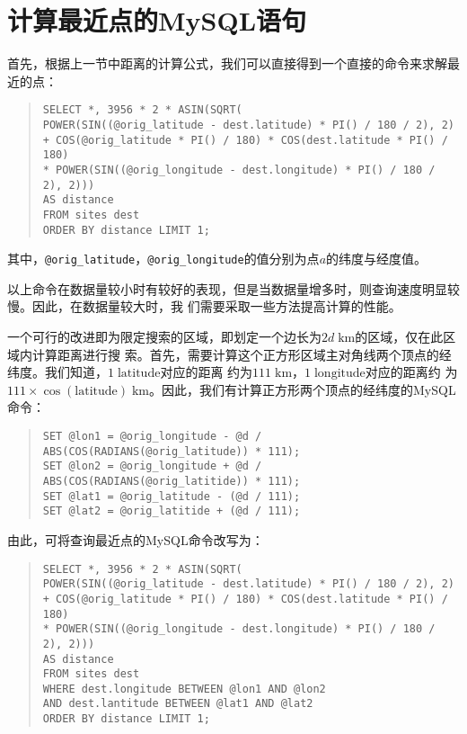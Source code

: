 \section{计算最近点的MySQL语句}
首先，根据上一节中距离的计算公式，我们可以直接得到一个直接的命令来求解最近的点：

\begin{quote}
  \texttt{SELECT *, 3956 * 2 * ASIN(SQRT(\\
    POWER(SIN((@orig\_latitude - dest.latitude) * PI() / 180 / 2), 2)\\
    + COS(@orig\_latitude * PI() / 180) * COS(dest.latitude * PI() / 180)\\
    * POWER(SIN((@orig\_longitude - dest.longitude) * PI() / 180 / 2), 2)))\\
    AS distance\\
    FROM sites dest\\
    ORDER BY distance LIMIT 1;}
\end{quote}
其中，\texttt{@orig\_latitude}，\texttt{@orig\_longitude}的值分别为点$a$的纬度与经度值。

以上命令在数据量较小时有较好的表现，但是当数据量增多时，则查询速度明显较慢。因此，在数据量较大时，我
们需要采取一些方法提高计算的性能。

一个可行的改进即为限定搜索的区域，即划定一个边长为$2d\;\mathrm{km}$的区域，仅在此区域内计算距离进行搜
索。首先，需要计算这个正方形区域主对角线两个顶点的经纬度。我们知道，$1\;\mathrm{latitude}$对应的距离
约为$111\;\mathrm{km}$，$1\;\mathrm{longitude}$对应的距离约
为$111\times\cos(\mathrm{latitude})\;\mathrm{km}$。因此，我们有计算正方形两个顶点的经纬度的MySQL命令：
\begin{quote}
  \texttt{SET @lon1 = @orig\_longitude - @d / ABS(COS(RADIANS(@orig\_latitude)) * 111);\\
  SET @lon2 = @orig\_longitude + @d / ABS(COS(RADIANS(@orig\_latitide)) * 111);\\
  SET @lat1 = @orig\_latitude - (@d / 111);\\
  SET @lat2 = @orig\_latitide + (@d / 111);}
\end{quote}

由此，可将查询最近点的MySQL命令改写为：

\begin{quote}
  \texttt{SELECT *, 3956 * 2 * ASIN(SQRT(\\
    POWER(SIN((@orig\_latitude - dest.latitude) * PI() / 180 / 2), 2)\\
    + COS(@orig\_latitude * PI() / 180) * COS(dest.latitude * PI() / 180)\\
    * POWER(SIN((@orig\_longitude - dest.longitude) * PI() / 180 / 2), 2)))\\
    AS distance\\
    FROM sites dest\\
    WHERE dest.longitude BETWEEN @lon1 AND @lon2\\
    AND dest.lantitude BETWEEN @lat1 AND @lat2\\
    ORDER BY distance LIMIT 1;}
\end{quote}

